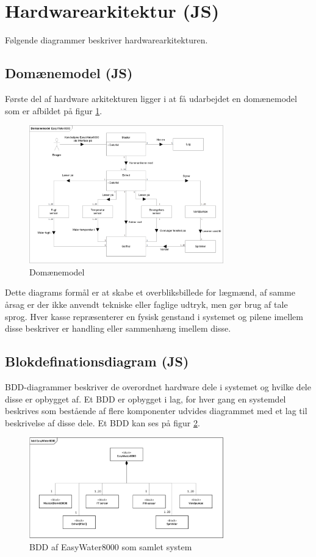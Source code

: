 \section{Hardwarearkitektur (JS)}
Følgende diagrammer beskriver hardwarearkitekturen. 

\subsection{Domænemodel (JS)}
Første del af hardware arkitekturen ligger i at få udarbejdet en domænemodel som er afbildet på figur \ref{lab:Domainmodel}.

\begin{figure}[H]
  \centering
    \includegraphics[width=0.75\textwidth]{Billeder/Domainmodel}
    \caption{Domænemodel}
    \label{lab:Domainmodel}
\end{figure}

Dette diagrams formål er at skabe et overbliksbillede for lægmænd, af samme årsag er der ikke anvendt tekniske eller faglige udtryk, men gør brug af tale sprog. Hver kasse repræsenterer en fysisk genstand i systemet og pilene imellem disse beskriver er handling eller sammenhæng imellem disse. 

\subsection{Blokdefinationsdiagram (JS)}
BDD-diagrammer beskriver de overordnet hardware dele i systemet og hvilke dele disse er opbygget af. Et BDD er opbygget i lag, for hver gang en systemdel beskrives som bestående af flere komponenter udvides diagrammet med et lag til beskrivelse af disse dele. Et BDD kan ses på figur \ref{lab:BDD}. 

\begin{figure}[H]
  \centering
    \includegraphics[width=0.75\textwidth]{Billeder/BDD}
    \caption{BDD af EasyWater8000 som samlet system}
    \label{lab:BDD}
\end{figure}


